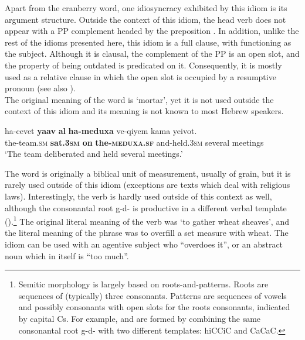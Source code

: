 \documentclass[output=paper]{langsci/langscibook}
\begin{document}
Apart from the cranberry word, one idiosyncracy exhibited by this idiom is its argument structure. Outside the context of this idiom, the head verb  does not appear with a PP complement headed by the preposition . In addition, unlike the rest of the idioms presented here, this idiom is a full clause, with  functioning as the subject. Although it is clausal, the complement of the PP is an open slot, and the property of being outdated is predicated on it. Consequently, it is mostly used as a relative clause in which the open slot is occupied by a resumptive pronoun (see also ).\\


\noindent\textbf{} The original meaning of the word  is `mortar', yet it is not used outside the context of this idiom and its meaning is not known to most Hebrew speakers.


	\ea\label{meduxa-canon}
    	\gll ha-cevet \textbf{ya{\shin}av} \textbf{{\ayin}al} \textbf{ha-meduxa} ve-qiyem kama ye{\shin}ivot.\\
    	   the-team.\textsc{sm} \textbf{sat.\textsc{3sm}} \textbf{on} \textbf{the-\textsc{meduxa}.\textsc{sf}} and-held.\textsc{3sm} several meetings\\
    	\glt `The team deliberated and held several meetings.'
	\z

\noindent\textbf{} The word  is originally a biblical unit of measurement, usually of grain, but it is rarely used outside of this idiom (exceptions are texts which deal with religious laws). Interestingly, the verb  is hardly used outside of this context as well, although the consonantal root g-d-{\shin} is productive in a different verbal template ().\footnote{Semitic morphology is largely based on roots-and-patterns. Roots are sequences of (typically) three consonants. Patterns are sequences of vowels and possibly consonants with open slots for the roots consonants, indicated by capital Cs. For example,  and  are formed by combining the same consonantal root  g-d-{\shin} with two different templates: hiCCiC and CaCaC.} The original literal meaning of the verb  was `to gather wheat sheaves', and the literal meaning of the phrase was to overfill a set measure with wheat. The idiom can be used with an agentive subject  who ``overdoes it'', or an abstract noun  which in itself is ``too much''.
\end{document}
